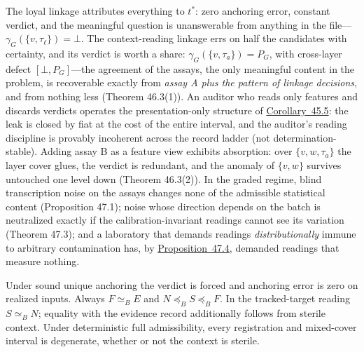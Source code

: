 The loyal linkage attributes everything to \(t^*\): zero anchoring error, constant verdict, and the meaningful question is unanswerable from anything in the file---\hspace{0pt}\(\gamma_G(\{v, \tau_\ell\}) = \bot\). The context-reading linkage errs on half the candidates with certainty, and its verdict is worth a share: \(\gamma_G(\{v, \tau_a\}) = P_G\), with cross-layer defect \([\bot, P_G]\)---\hspace{0pt}the agreement of the assays, the only meaningful content in the problem, is recoverable exactly from \emph{assay A plus the pattern of linkage decisions}, and from nothing less (Theorem 46.3(1)). An auditor who reads only features and discards verdicts operates the presentation-only structure of \hyperlink{stmt:45.5}{Corollary~45.5}: the leak is closed by fiat at the cost of the entire interval, and the auditor's reading discipline is provably incoherent across the record ladder (not determination-stable). Adding assay B as a feature view exhibits absorption: over \(\{v, w, \tau_a\}\) the layer cover glues, the verdict is redundant, and the anomaly of \(\{v,w\}\) survives untouched one level down (Theorem 46.3(2)). In the graded regime, blind transcription noise on the assays changes none of the admissible statistical content (Proposition 47.1); noise whose direction depends on the batch is neutralized exactly if the calibration-invariant readings cannot see its variation (Theorem 47.3); and a laboratory that demands readings \emph{distributionally} immune to arbitrary contamination has, by \hyperlink{stmt:47.4}{Proposition~47.4}, demanded readings that measure nothing.



\begin{thmplain}

Under sound unique anchoring the verdict is forced and anchoring error is zero on realized inputs. Always \(F\simeq_B E\) and \(N\preceq_B S\preceq_B F\). In the tracked-target reading \(S\simeq_B N\); equality with the evidence record additionally follows from sterile context. Under deterministic full admissibility, every registration and mixed-cover interval is degenerate, whether or not the context is sterile.
\end{thmplain}

